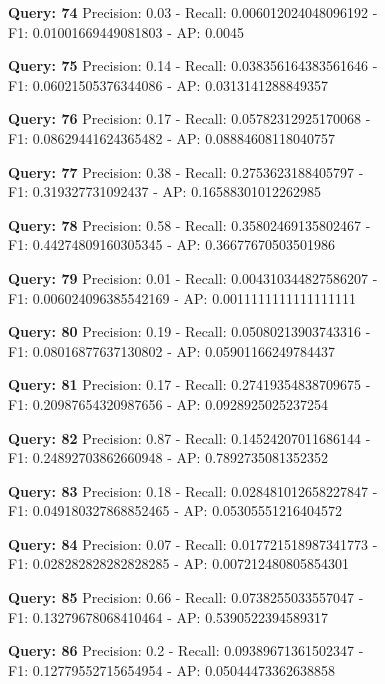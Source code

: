 \documentclass[a4paper, 11pt]{article}
\begin{document}
\textbf{Query: 74}
Precision: 0.03 - Recall: 0.006012024048096192 - \\
F1: 0.01001669449081803 - AP: 0.0045

\textbf{Query: 75}
Precision: 0.14 - Recall: 0.038356164383561646 - \\
F1: 0.06021505376344086 - AP:  0.0313141288849357

\textbf{Query: 76}
Precision: 0.17 - Recall: 0.05782312925170068 - \\
F1: 0.08629441624365482 - AP:  0.08884608118040757

\textbf{Query: 77}
Precision: 0.38 - Recall: 0.2753623188405797 - \\
F1: 0.319327731092437 - AP:  0.16588301012262985

\textbf{Query: 78}
Precision: 0.58 - Recall: 0.35802469135802467 - \\
F1: 0.44274809160305345 - AP:  0.36677670503501986

\textbf{Query: 79}
Precision: 0.01 - Recall: 0.004310344827586207 - \\
F1: 0.006024096385542169 - AP:  0.0011111111111111111

\textbf{Query: 80}
Precision: 0.19 - Recall: 0.05080213903743316 - \\
F1: 0.08016877637130802 - AP:  0.05901166249784437

\textbf{Query: 81}
Precision: 0.17 - Recall: 0.27419354838709675 - \\
F1: 0.20987654320987656 - AP:  0.0928925025237254

\textbf{Query: 82}
Precision: 0.87 - Recall: 0.14524207011686144 -\\
F1: 0.24892703862660948 - AP:  0.7892735081352352

\textbf{Query: 83}
Precision: 0.18 - Recall: 0.028481012658227847 - \\
F1: 0.049180327868852465 - AP:  0.05305551216404572

\textbf{Query: 84}
Precision: 0.07 - Recall: 0.017721518987341773 - \\
F1: 0.028282828282828285 - AP:  0.007212480805854301

\textbf{Query: 85}
Precision: 0.66 - Recall: 0.0738255033557047 - \\
F1: 0.13279678068410464 - AP:  0.5390522394589317

\textbf{Query: 86}
Precision: 0.2 - Recall: 0.09389671361502347 - \\
F1: 0.12779552715654954 - AP:  0.05044473362638858
\end{document}
